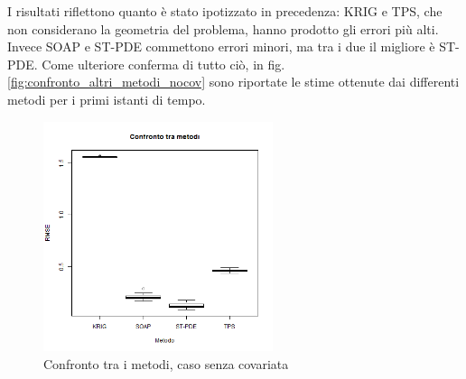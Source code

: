 \documentclass[a4paper,11pt,twoside,openright]{book}							%
\begin{document}
I risultati riflettono quanto è stato ipotizzato in precedenza: KRIG e TPS, che non considerano la geometria del problema, hanno prodotto gli errori più alti. Invece SOAP e ST-PDE commettono errori minori, ma tra i due il migliore è ST-PDE. Come ulteriore conferma di tutto ciò, in fig. \ref{fig:confronto_altri_metodi_nocov} sono riportate le stime ottenute dai differenti metodi per i primi istanti di tempo.  

\begin{figure}[t]
	\centering
	\includegraphics[width=0.60\textwidth]{Immagini/Confronto_metodi.png}   
	\caption{Confronto tra i metodi, caso senza covariata}
	\label{fig:cfr}
\end{figure}
\end{document}
